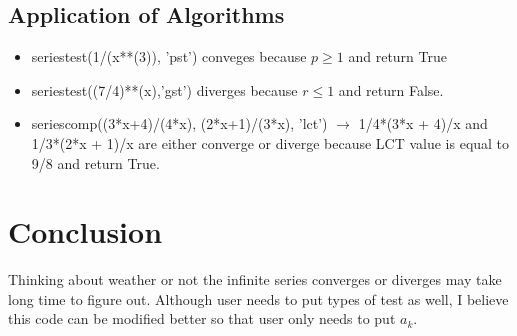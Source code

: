 \documentclass[12pt]{article}
\begin{document}
\subsection{Application of Algorithms}
\begin{itemize}
\item seriestest(1/(x**(3)), 'pst') conveges because $p\ge 1$ and return True
\item seriestest((7/4)**(x),'gst') diverges because $r\le 1$ and return False.
\item seriescomp((3*x+4)/(4*x), (2*x+1)/(3*x), 'lct') $\to$ 1/4*(3*x + 4)/x and 1/3*(2*x + 1)/x are either converge or diverge because LCT value is equal to 9/8 and return True.
\end{itemize}
\section{Conclusion}
Thinking about weather or not the infinite series converges or diverges may take long time to figure out. Although user needs to put types of test as well, I believe this code can be modified better so that user only needs to put $a_k$.
\end{document}
